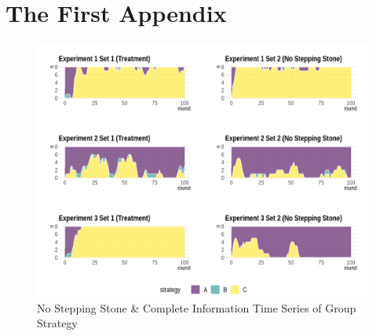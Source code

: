 \appendix
\renewcommand\thefigure{\thechapter.\arabic{figure}}
\renewcommand\thetable{\thechapter.\arabic{table}}


\chapter{The First Appendix}

\begin{figure}[h]
\captionsetup{justification=centering}
  \caption[caption]{No Stepping Stone \& Complete Information Time Series of Group Strategy}
   \label{fig:Series1C}
    \includegraphics[width = \textwidth]{Images/AllAreaPlot1C.png}
    
\end{figure}

